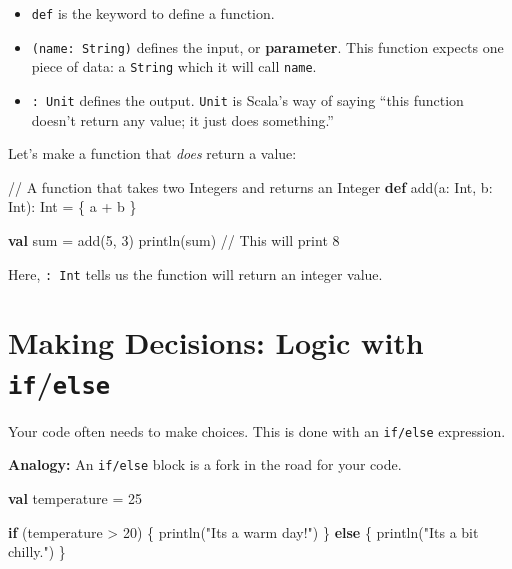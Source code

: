 \documentclass[
  letterpaper,
  DIV=11,
  numbers=noendperiod]{scrreprt}
\newenvironment{Shaded}{\begin{snugshade}}{\end{snugshade}}
\newcommand{\BuiltInTok}[1]{\textcolor[rgb]{0.00,0.23,0.31}{#1}}
\newcommand{\CommentTok}[1]{\textcolor[rgb]{0.37,0.37,0.37}{#1}}
\newcommand{\ControlFlowTok}[1]{\textcolor[rgb]{0.00,0.23,0.31}{\textbf{#1}}}
\newcommand{\DecValTok}[1]{\textcolor[rgb]{0.68,0.00,0.00}{#1}}
\newcommand{\FunctionTok}[1]{\textcolor[rgb]{0.28,0.35,0.67}{#1}}
\newcommand{\KeywordTok}[1]{\textcolor[rgb]{0.00,0.23,0.31}{\textbf{#1}}}
\newcommand{\NormalTok}[1]{\textcolor[rgb]{0.00,0.23,0.31}{#1}}
\newcommand{\OperatorTok}[1]{\textcolor[rgb]{0.37,0.37,0.37}{#1}}
\newcommand{\StringTok}[1]{\textcolor[rgb]{0.13,0.47,0.30}{#1}}
\providecommand{\tightlist}{%
  \setlength{\itemsep}{0pt}\setlength{\parskip}{0pt}}
\begin{document}
\begin{itemize}
\tightlist
\item
  \texttt{def} is the keyword to define a function.
\item
  \texttt{(name:\ String)} defines the input, or \textbf{parameter}.
  This function expects one piece of data: a \texttt{String} which it
  will call \texttt{name}.
\item
  \texttt{:\ Unit} defines the output. \texttt{Unit} is Scala's way of
  saying ``this function doesn't return any value; it just does
  something.''
\end{itemize}

Let's make a function that \emph{does} return a value:

\begin{Shaded}
\begin{Highlighting}[]
\CommentTok{// A function that takes two Integers and returns an Integer}
\KeywordTok{def} \FunctionTok{add}\OperatorTok{(}\NormalTok{a}\OperatorTok{:} \BuiltInTok{Int}\OperatorTok{,}\NormalTok{ b}\OperatorTok{:} \BuiltInTok{Int}\OperatorTok{):} \BuiltInTok{Int} \OperatorTok{=} \OperatorTok{\{}
\NormalTok{  a }\OperatorTok{+}\NormalTok{ b}
\OperatorTok{\}}

\KeywordTok{val}\NormalTok{ sum }\OperatorTok{=} \FunctionTok{add}\OperatorTok{(}\DecValTok{5}\OperatorTok{,} \DecValTok{3}\OperatorTok{)}
\FunctionTok{println}\OperatorTok{(}\NormalTok{sum}\OperatorTok{)} \CommentTok{// This will print 8}
\end{Highlighting}
\end{Shaded}

Here, \texttt{:\ Int} tells us the function will return an integer
value.

\section{\texorpdfstring{Making Decisions: Logic with
\texttt{if}/\texttt{else}}{Making Decisions: Logic with if/else}}\label{making-decisions-logic-with-ifelse}

Your code often needs to make choices. This is done with an
\texttt{if/else} expression.

\textbf{Analogy:} An \texttt{if/else} block is a fork in the road for
your code.

\begin{Shaded}
\begin{Highlighting}[]
\KeywordTok{val}\NormalTok{ temperature }\OperatorTok{=} \DecValTok{25}

\ControlFlowTok{if} \OperatorTok{(}\NormalTok{temperature }\OperatorTok{\textgreater{}} \DecValTok{20}\OperatorTok{)} \OperatorTok{\{}
  \FunctionTok{println}\OperatorTok{(}\StringTok{"It\textquotesingle{}s a warm day!"}\OperatorTok{)}
\OperatorTok{\}} \ControlFlowTok{else} \OperatorTok{\{}
  \FunctionTok{println}\OperatorTok{(}\StringTok{"It\textquotesingle{}s a bit chilly."}\OperatorTok{)}
\OperatorTok{\}}
\end{Highlighting}
\end{Shaded}
\end{document}

